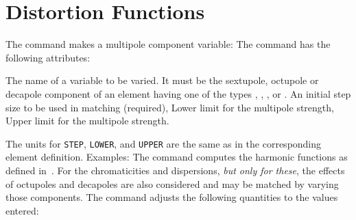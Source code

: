 \section{Distortion Functions}
\label{S-HCELL}
The  command makes a multipole component variable:
The command has the following attributes:
\begin{mylist}
The name of a variable to be varied.
It must be the sextupole, octupole or decapole component
of an element having one of the types ,
,
, or .
An initial step size to be used in matching (required),
Lower limit for the multipole strength,
Upper limit for the multipole strength.
\end{mylist}
The units for {\tt STEP}, {\tt LOWER}, and {\tt UPPER} are the same
as in the corresponding element definition.
Examples:
The  command
computes the harmonic functions as defined in~\cite{B-DON82}.
For the chromaticities and dispersions, {\em but only for these},
the effects of octupoles and decapoles are also considered and may
be matched by varying those components.
The  command
adjusts the following quantities to the values entered:
